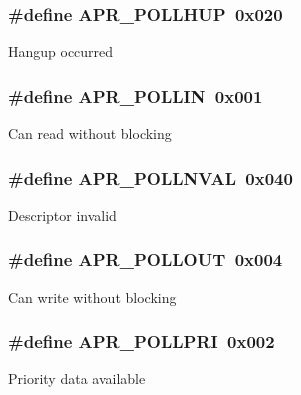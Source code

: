 \subsubsection[{\texorpdfstring{A\+P\+R\+\_\+\+P\+O\+L\+L\+H\+UP}{APR_POLLHUP}}]{\setlength{\rightskip}{0pt plus 5cm}\#define A\+P\+R\+\_\+\+P\+O\+L\+L\+H\+UP~0x020}\hypertarget{group__pollopts_gace76603c4fa4b56f8b5977ff1ceb6f3b}{}\label{group__pollopts_gace76603c4fa4b56f8b5977ff1ceb6f3b}
Hangup occurred 
\subsubsection[{\texorpdfstring{A\+P\+R\+\_\+\+P\+O\+L\+L\+IN}{APR_POLLIN}}]{\setlength{\rightskip}{0pt plus 5cm}\#define A\+P\+R\+\_\+\+P\+O\+L\+L\+IN~0x001}\hypertarget{group__pollopts_ga746222e6b858bc2fc77328d59f78e788}{}\label{group__pollopts_ga746222e6b858bc2fc77328d59f78e788}
Can read without blocking 
\subsubsection[{\texorpdfstring{A\+P\+R\+\_\+\+P\+O\+L\+L\+N\+V\+AL}{APR_POLLNVAL}}]{\setlength{\rightskip}{0pt plus 5cm}\#define A\+P\+R\+\_\+\+P\+O\+L\+L\+N\+V\+AL~0x040}\hypertarget{group__pollopts_ga132da215e207d4685fb467cc64a73f1b}{}\label{group__pollopts_ga132da215e207d4685fb467cc64a73f1b}
Descriptor invalid 
\subsubsection[{\texorpdfstring{A\+P\+R\+\_\+\+P\+O\+L\+L\+O\+UT}{APR_POLLOUT}}]{\setlength{\rightskip}{0pt plus 5cm}\#define A\+P\+R\+\_\+\+P\+O\+L\+L\+O\+UT~0x004}\hypertarget{group__pollopts_ga6fb703db1d11e2c5f66d8c6146e56053}{}\label{group__pollopts_ga6fb703db1d11e2c5f66d8c6146e56053}
Can write without blocking 
\subsubsection[{\texorpdfstring{A\+P\+R\+\_\+\+P\+O\+L\+L\+P\+RI}{APR_POLLPRI}}]{\setlength{\rightskip}{0pt plus 5cm}\#define A\+P\+R\+\_\+\+P\+O\+L\+L\+P\+RI~0x002}\hypertarget{group__pollopts_ga196c38e1914077c4c9a0cf3ce87f1b9c}{}\label{group__pollopts_ga196c38e1914077c4c9a0cf3ce87f1b9c}
Priority data available 